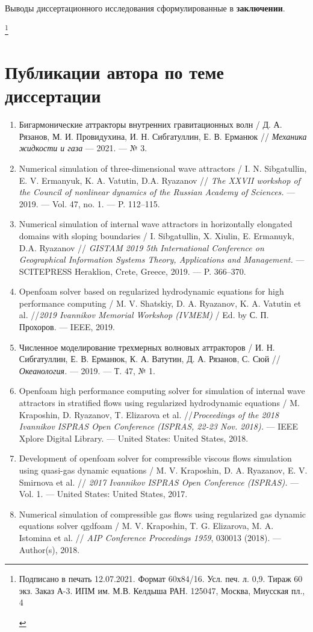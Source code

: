 \documentclass[utf8x]{G7-32} %
\newcommand\blfootnote[1]{%
  \begingroup
  \renewcommand\thefootnote{}\footnote{#1}%
  \addtocounter{footnote}{-1}%
  \endgroup
}
\begin{document}
Выводы диссертационного исследования сформулированные в \textbf{заключении}.

\blfootnote{
\begin{centering}
    Подписано в печать 12.07.2021. Формат 60х84/16.  Усл. печ. л. 0,9. Тираж 60 экз. Заказ А-3. ИПМ им. М.В. Келдыша РАН. 125047, Москва, Миусская пл., 4
\end{centering}
}

\section*{Публикации автора по теме диссертации}
\footnotesize{
\begin{enumerate}[1.]
  \item Бигармонические аттракторы внутренних гравитационных волн / Д. А. Рязанов, М. И. Провидухина, И. Н. Сибгатуллин, Е. В. Ерманюк // \textit{Механика жидкости и газа}  — 2021. — № 3. 
  \item Numerical simulation of three-dimensional wave attractors / I. N. Sibgatullin, E. V. Ermanyuk, K. A. Vatutin, D.A. Ryazanov // \textit{The XXVII workshop of the Council of nonlinear dynamics of the Russian Academy of Sciences.} — 2019. — Vol. 47, no. 1. — P. 112–115.
  \item Numerical simulation of internal wave attractors in horizontally elongated domains with sloping boundaries / I. Sibgatullin, X. Xiulin, E. Ermanuyk, D.A. Ryazanov // \textit{GISTAM 2019 5th International Conference on Geographical Information Systems Theory, Applications and Management.} — SCITEPRESS Heraklion, Crete, Greece, 2019. — P. 366–370.
  \item Openfoam solver based on regularized hydrodynamic equations for high performance computing / M. V. Shatskiy, D. A. Ryazanov, K. A. Vatutin et al. //\textit{2019 Ivannikov Memorial Workshop (IVMEM)} / Ed. by С. П. Прохоров. — IEEE, 2019.
  \item  Численное моделирование трехмерных волновых аттракторов / И. Н. Сибгатуллин, Е. В. Ерманюк, К. А. Ватутин, Д. А. Рязанов, С. Сюй //\textit{Океанология.} — 2019. — Т. 47, № 1.
  \item Openfoam high performance computing solver for simulation of internal wave attractors in stratified flows using regularized hydrodynamic equations / M. Kraposhin, D. Ryazanov, T. Elizarova et al. //\textit{Proceedings of the 2018 Ivannikov ISPRAS Open Conference (ISPRAS, 22-23 Nov. 2018).} — IEEE Xplore Digital Library. — United States: United States, 2018.
  \item Development of openfoam solver for compressible viscous flows simulation using quasi-gas dynamic equations / M. V. Kraposhin, D. A. Ryazanov, E. V. Smirnova et al. // \textit{2017 Ivannikov ISPRAS Open Conference (ISPRAS).} — Vol. 1. — United States: United States, 2017.
  \item Numerical simulation of compressible gas flows using regularized gas dynamic equations solver qgdfoam / M. V. Kraposhin, T. G. Elizarova, M. A. Istomina et al. // \textit{AIP Conference Proceedings 1959}, 030013 (2018). — Author(s), 2018.
\end{enumerate}
}
\end{document}
